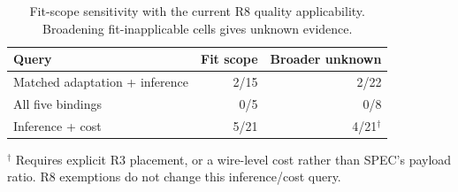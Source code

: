 \begin{table}[t]\centering\footnotesize
\caption{Fit-scope sensitivity with the current R8 quality applicability. Broadening fit-inapplicable cells gives unknown evidence.}\label{tab:r36-sensitivity}
\begin{tabularx}{\columnwidth}{@{}Yrr@{}}\toprule
Query & Fit scope & Broader unknown\\\midrule
Matched adaptation + inference & 2/15 & 2/22\\
All five bindings & 0/5 & 0/8\\
\midrule Inference + cost & 5/21 & 4/21$^\dagger$\\
\bottomrule\end{tabularx}
\par\smallskip\raggedright $^\dagger$ Requires explicit R3 placement, or a wire-level cost rather than SPEC's payload ratio. R8 exemptions do not change this inference/cost query.
\end{table}
